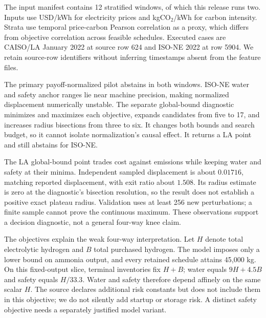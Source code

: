 \documentclass[11pt]{article}
\begin{document}
The input manifest contains 12 stratified windows, of which this release runs two.
Inputs use USD/kWh for electricity prices and kgCO$_2$/kWh for carbon intensity.
Strata use temporal price-carbon Pearson correlation as a proxy, which differs from objective correlation across feasible schedules.
Executed cases are CAISO/LA January 2022 at source row 624 and ISO-NE 2022 at row 5904.
We retain source-row identifiers without inferring timestamps absent from the feature files.

The primary payoff-normalized pilot abstains in both windows.
ISO-NE water and safety anchor ranges lie near machine precision, making normalized displacement numerically unstable.
The separate global-bound diagnostic minimizes and maximizes each objective, expands candidates from five to 17, and increases radius bisections from three to six.
It changes both bounds and search budget, so it cannot isolate normalization's causal effect.
It returns a LA point and still abstains for ISO-NE.
\begin{table}[htbp]\centering\scriptsize\resizebox{\linewidth}{!}{}
\caption{Actual 48-hour schedules. NA marks abstention. Cost uses USD, CO2 uses kg, water follows source volume coefficients, and safety is a throughput index. Each bound convention defines its own normalized validation $R$.}\label{tab:ammonia}\end{table}

The LA global-bound point trades cost against emissions while keeping water and safety at their minima.
Independent sampled displacement is about $0.01716$, matching reported displacement, with exit ratio about $1.508$.
Its radius estimate is zero at the diagnostic's bisection resolution, so the result does not establish a positive exact plateau radius.
Validation uses at least 256 new perturbations; a finite sample cannot prove the continuous maximum.
These observations support a decision diagnostic, not a general four-way knee claim.

The objectives explain the weak four-way interpretation.
Let $H$ denote total electrolytic hydrogen and $B$ total purchased hydrogen.
The model imposes only a lower bound on ammonia output, and every retained schedule attains 45,000 kg. On this fixed-output slice, terminal inventories fix $H+B$; water equals $9H+4.5B$ and safety equals $H/33.3$.
Water and safety therefore depend affinely on the same scalar $H$.
The source declares additional risk constants but does not include them in this objective; we do not silently add startup or storage risk.
A distinct safety objective needs a separately justified model variant.
\end{document}
